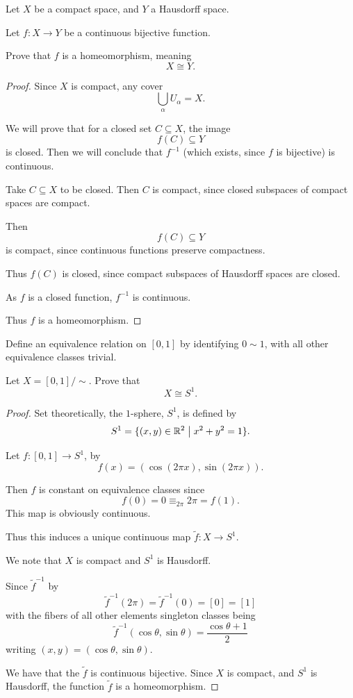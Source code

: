 \documentclass[11pt]{article}
\begin{document}
\begin{prob}
    Let $X$ be a compact space, 
    and $Y$ a Hausdorff space. 

    Let $f : X \to Y$ be a continuous 
    bijective function. 

    Prove that $f$ is a homeomorphism, meaning 
    \[
        X \cong Y. 
    \]
\end{prob}
\begin{proof}
    Since $X$ is compact, 
    any cover 
    \[
        \bigcup_{\alpha}  U_\alpha = X. 
    \]

    We will prove that 
    for a closed set $C \subseteq X$, 
    the image 
    \[
        f(C) \subseteq Y  
    \]
    is closed.
    Then we will conclude that $f^{-1}$ (which 
    exists, since $f$ is bijective) is continuous. 

    Take $C \subseteq X$ to be closed. 
    Then $C$ is compact, since closed subspaces of 
    compact spaces are compact. 

    Then 
    \[
        f(C) \subseteq Y 
    \]
    is compact, since continuous functions preserve 
    compactness. 

    Thus $f(C)$ is closed, since compact subspaces 
    of Hausdorff spaces are closed. 

    As $f$ is a closed function, $f^{-1}$ is continuous. 

    Thus $f$ is a homeomorphism. 
\end{proof}

\begin{prob}
    Define an equivalence relation on 
    $[0,1]$ by identifying $0 \sim 1$, 
    with all other equivalence classes trivial. 

    Let $X = [0,1]/\sim$. 
    Prove that 
    \[
        X \cong S^1. 
    \]
\end{prob}
\begin{proof}
    Set theoretically, the 
    $1$-sphere, $S^1$, is defined by 
    \[
        S^1 = \{(x,y) \in \mathbb R^2 \bigm| 
        x^2 + y^2 = 1\}. 
    \]

    Let $f : [0,1] \to S^1$, by 
    \[
        f(x) = (\cos(2\pi x), \sin(2\pi x)). 
    \]

    Then $f$ is constant on equivalence classes since 
    \[
        f(0) = 0 \equiv_{2\pi} 2\pi = f(1). 
    \]
    This map is obviously continuous.

    Thus this induces a 
    unique continuous map $\widetilde f : X 
    \to S^1$.  

    We note that $X$ is compact and $S^1$ is Hausdorff. 

    Since $\widetilde f^{-1}$ by 
    \[
        \widetilde f^{-1}(2\pi) = 
        \widetilde f^{-1}(0) = [0] = [1] 
    \]
    with the fibers of all other elements singleton 
    classes being 
    \[
        \widetilde f^{-1}(\cos \theta, \sin \theta) 
        = \frac{\cos \theta + 1}{2} 
    \]
    writing $(x,y) = (\cos \theta, \sin \theta)$. 

    We have that the $\widetilde f$ is 
    continuous bijective. 
    Since $X$ is compact, and $S^1$ is Hausdorff, 
    the function $\widetilde f$ is a homeomorphism. 
\end{proof}
\end{document}
